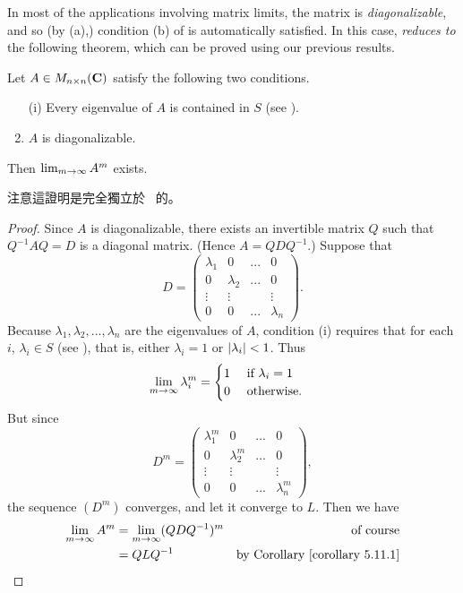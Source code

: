 In most of the applications involving matrix limits, the matrix is \emph{diagonalizable}, and so (by (a),) condition (b) of  is automatically satisfied.
In this case,  \emph{reduces to} the following theorem, which can be proved using our previous results.

\begin{theorem} \label{thm 5.13}
Let \(A \in M_{n \times n}(\mathbf{C})\) satisfy the following two conditions.
\begin{enumerate}
\item[(i)] Every eigenvalue of \(A\) is contained in \(S\) (see ).
\item \(A\) is diagonalizable.
\end{enumerate}
Then \(\lim_{m \to \infty} A^m\) exists.
\end{theorem}

\begin{note}
注意這證明是完全獨立於\  的。
\end{note}

\begin{proof}
Since \(A\) is diagonalizable, there exists an invertible matrix \(Q\) such that \(Q^{-1} A Q = D\) is a diagonal matrix.
(Hence \(A = Q D Q^{-1}\).)
Suppose that
\[
    D = \begin{pmatrix}
        \lambda_1 & 0 & ... & 0 \\
        0 & \lambda_2 & ... & 0 \\
        \vdots & \vdots & & \vdots \\
        0 & 0 & ... & \lambda_n
    \end{pmatrix}.
\]
Because \(\lambda_1, \lambda_2, ... , \lambda_n\) are the eigenvalues of \(A\), condition (i) requires that for each \(i\),
\(\lambda_i \in S\) (see ), that is, either \(\lambda_i = 1\) or \(\lvert\lambda_i\rvert < 1\).
Thus
\begin{equation*}
    \lim_{m \to \infty} \lambda_i^m = \begin{cases}
        1 \quad \text{ if } \lambda_i = 1 \\
        0 \quad \text{ otherwise.}
    \end{cases}
\end{equation*}
But since
\[
    D^m = \begin{pmatrix}
        \lambda_1^m & 0 & ... & 0 \\
        0 & \lambda_2^m & ... & 0 \\
        \vdots & \vdots & & \vdots \\
        0 & 0 & ... & \lambda_n^m
    \end{pmatrix},
\]
the sequence \((D^m)\) converges, and let it converge to \(L\).
Then we have
\begin{align*}
    \lim_{m \toINF} A^m & = \lim_{m \toINF} (Q D Q^{-1})^m & \text{of course} \\
        & = Q L Q^{-1} & \text{by \CORO{5.11.1}}
\end{align*}
\end{proof}

